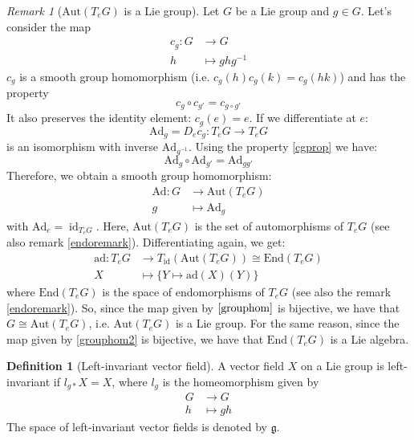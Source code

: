 \documentclass[a4paper,11pt,titlepage, article, oneside]{memoir}
\numberwithin{equation}{section}
\theoremstyle{definition}
\newtheorem{definition}[theorem]{Definition}
\theoremstyle{remark}
\newtheorem{remark}[theorem]{Remark}
\DeclareMathOperator{\id}{id}
\newcommand{\lie}[1]{\mathfrak{#1}}
\begin{document}
\begin{remarkbox}\begin{remark} [$\text{Aut}(T_e G)$ is a Lie group] \label{autremark}
Let $G$ be a  Lie group and $g \in G$. Let's consider the map 
\begin{align} \label{cgmap}
c_g \colon G &\rightarrow G \\
h &\mapsto g h g^{-1} \nonumber
\end{align}
$c_g$ is  a smooth group homomorphism (i.e. $c_g(h)c_g(k)=c_g(hk)$) and has the property 
\begin{equation} \label{cgprop}
c_g \circ c_{g'} = c_{g \circ g'}
\end{equation}
 It also preserves the identity element: $c_g(e) = e$. If we differentiate at $e$:
\begin{equation}
\text{Ad}_g = D_e c_g \colon T_e G \rightarrow T_e G
\end{equation}
is an isomorphism with inverse $\text{Ad}_{g^{-1}}$. Using the property \eqref{cgprop} we have:
\begin{equation}
\text{Ad}_g \circ \text{Ad}_{g'} = \text{Ad}_{gg'}
\end{equation}
Therefore, we obtain a smooth group homomorphism:
\begin{align} \label{grouphom}
\text{Ad} \colon G &\rightarrow \text{Aut}(T_e G)  \\
g &\mapsto \text{Ad}_g \nonumber
\end{align}
with $\text{Ad}_e = \id_{T_e G}$. Here, $\text{Aut}(T_e G)$ is the set of automorphisms of $T_e G$ (see also remark \ref{endoremark}).
Differentiating again, we get:
\begin{align} \label{grouphom2}
\text{ad} \colon T_e G &\rightarrow T_{\id} (\text{Aut}(T_e G)) \cong \text{End}(T_e G) \\
X &\mapsto \{ Y \mapsto \text{ad}(X)(Y)\} \nonumber
\end{align}
where $\text{End}(T_e G)$ is the space of endomorphisms of $T_e G$ (see also the remark \eqref{endoremark}).
So, since the map given by $\ref{grouphom}$ is bijective, we have that $G \cong \text{Aut}(T_e G)$, i.e. $\text{Aut}(T_e G)$ is a Lie group.  For the same reason, since the map given by \eqref{grouphom2} is bijective, we have that $\text{End}(T_e G)$ is a Lie algebra.
\end{remark}\end{remarkbox}

\begin{definition}[Left-invariant vector field]
A vector field $X$ on a Lie group is left-invariant if $l_{g*}X = X$, where $l_g$ is the homeomorphism given by
\begin{align}
G &\rightarrow G \\
h &\mapsto gh \nonumber
\end{align}
The space of left-invariant vector fields is denoted by $\lie{g}$. 
\end{definition}
\end{document}
